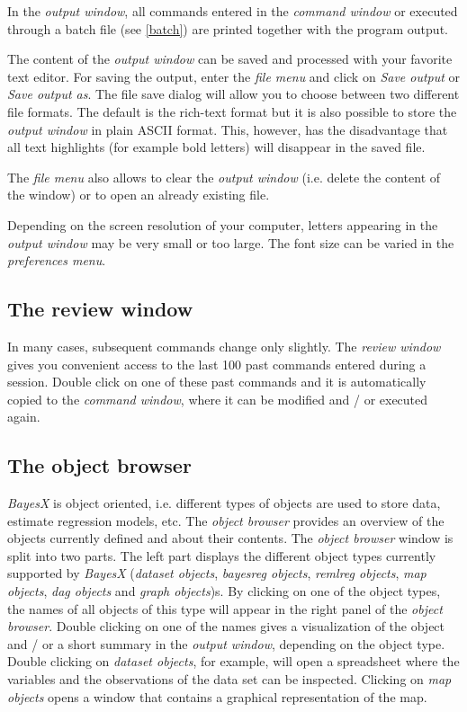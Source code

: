 In the {\em output window}, all commands entered in the {\em
command window} or executed through a batch file (see
\autoref{batch}) are printed together with the program output.

 The content of the {\em output window}
can be saved and processed with your favorite text editor. For
saving the output, enter the {\em file menu} and click on {\em
Save output} or {\em Save output as}. The file save dialog will
allow you to choose between two different file formats. The
default is the rich-text format but it is also possible to store
the {\em output window} in plain ASCII format. This, however, has
the disadvantage that all text highlights (for example bold
letters) will disappear in the saved file.

The {\em file menu} also allows to clear the {\em output window}
(i.e. delete the content of the window) or to open an already
existing file.

Depending on the screen resolution of your computer, letters
appearing in the {\em output window} may be very small or too
large. The font size can be varied in the {\em preferences menu}.

\subsection{The review window}
 

In many cases, subsequent commands change only slightly. The {\em
review window} gives you convenient access to the last 100 past
commands entered during a session. Double click on one of these
past commands and it is automatically copied to the {\em command
window}, where it can be modified and / or executed again.

\subsection{The object browser}

{\em BayesX} is object oriented, i.e. different types of objects
are used to store data, estimate regression models, etc. The {\em
object browser} provides an overview of the objects currently
defined and about their contents. The {\em object browser} window
is split into two parts. The left part displays the different
object types currently supported by {\em BayesX} ({\em dataset
objects}, {\em bayesreg objects}, {\em remlreg objects}, {\em map
objects}, {\em dag objects} and {\em graph objects})s. By clicking
on one of the object types, the names of all objects of this type
will appear in the right panel of the {\em object browser}. Double
clicking on one of the names gives a visualization of the object
and / or a short summary in the {\em output window}, depending on
the object type. Double clicking on {\em dataset objects}, for
example, will open a spreadsheet where the variables and the
observations of the data set can be inspected. Clicking on {\em
map objects} opens a window that contains a graphical
representation of the map.

